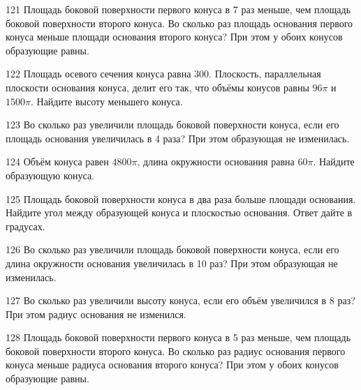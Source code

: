 \documentclass[a4paper]{article}
\begin{document}
\begin{taskBN}{121}
Площадь боковой поверхности первого конуса в 7 раз меньше, чем площадь боковой поверхности второго конуса. Во сколько раз площадь основания первого конуса меньше площади основания второго конуса? При этом у обоих конусов образующие равны.
\end{taskBN}

\begin{taskBN}{122}
Площадь осевого сечения конуса равна $300$. Плоскость, параллельная плоскости основания конуса,  делит его так, что объёмы конусов равны $96\pi$ и $1500\pi$. Найдите высоту меньшего конуса. 
\end{taskBN}

\begin{taskBN}{123}
Во сколько раз увеличили площадь боковой поверхности конуса, если его площадь основания увеличилась в 4 раза? При этом образующая не изменилась.
\end{taskBN}

\begin{taskBN}{124}
Объём конуса равен $4800\pi$, длина окружности основания равна $60\pi$. Найдите образующую конуса. 
\end{taskBN}

\begin{taskBN}{125}
Площадь боковой поверхности конуса в два раза больше площади основания. Найдите угол между образующей конуса и плоскостью основания. Ответ дайте в градусах.
\end{taskBN}

\begin{taskBN}{126}
Во сколько раз увеличили площадь боковой поверхности конуса, если его длина окружности основания увеличилась в 10 раз? При этом образующая не изменилась.
\end{taskBN}

\begin{taskBN}{127}
Во сколько раз увеличили высоту конуса, если его объём увеличился в 8 раз? При этом радиус основания не изменился.
\end{taskBN}

\begin{taskBN}{128}
Площадь боковой поверхности первого конуса в 5 раз меньше, чем площадь боковой поверхности второго конуса. Во сколько раз радиус основания первого конуса меньше радиуса основания второго конуса? При этом у обоих конусов образующие равны.
\end{taskBN}
\end{document}
